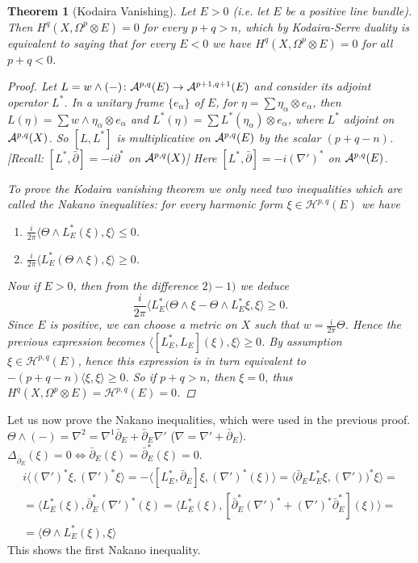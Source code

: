 \documentclass[A4paper, british]{amsart}
\theoremstyle{darkgreentheorem}
\newtheorem{thm}{Theorem}[section]
\theoremstyle{darkbluedefinition}
\theoremstyle{darkredexample}
\theoremstyle{remark}
\renewcommand{\H}{\mathcal{H}}
\newcommand{\1}{\mathbbm{1}}
\newcommand{\ot}{\otimes}
\begin{document}
\begin{thm}[Kodaira Vanishing]
    Let $E>0$ (i.e. let $E$ be a positive line bundle).
    Then $H^{q}(X,\Omega^{p}\ot E)=0$ for every $p+q>n$, which by Kodaira-Serre duality is equivalent to saying that for every $E<0$ we have $H^{q}(X,\Omega^{p}\ot E)=0$ for all $p+q<0$.
    \begin{proof}
	Let $L=w\wedge (-)\colon \mathcal{A}^{p,q}(E)\to \mathcal{A}^{p+1,q+1}(E)$ and consider its adjoint operator $L^{*}$.
	In a unitary frame $\{e_{\alpha}\}$ of $E$, for $\eta=\sum \eta_{\alpha}\ot e_{\alpha}$, then $L(\eta)=\sum w\wedge \eta_{\alpha}\ot e_{\alpha}$ and $L^{*}(\eta)=\sum L^{*}(\eta_{\alpha})\ot e_{\alpha}$, where $L^{*}$ adjoint on $\mathcal{A}^{p,q}(X)$.
	So $[L,L^{*}]$ is multiplicative on $\mathcal{A}^{p,q}(E)$ by the scalar $(p+q-n)$.
	[Recall: $[L^{*},\bar{\partial}]=-i\partial^{*}$ on $\mathcal{A}^{p,q}(X)$]
	Here $[L^{*},\bar{\partial}]=-i(\nabla')^{*}$ on $\mathcal{A}^{p,q}(E)$.

	To prove the Kodaira vanishing theorem we only need two inequalities which are called the \textit{Nakano inequalities}: for every harmonic form $\xi \in \H^{p,q}(E)$ we have
	\begin{enumerate}[label=\arabic*)]
	    \item $\frac{i}{2\pi} \langle \Theta \wedge L_{E}^{*}(\xi), \xi\rangle \leqslant 0$.
	    \item $\frac{i}{2\pi} \langle L_{E}^{*}(\Theta \wedge \xi),\xi\rangle \geqslant 0$.
	\end{enumerate}

	Now if $E>0$, then from the difference $2)-1)$ we deduce
	\[ \frac{i}{2\pi}\langle L_{E}^{*}(\Theta \wedge \xi -\Theta \wedge L_{E}^{*}\xi ,\xi\rangle \geqslant 0 .\]
	Since $E$ is positive, we can choose a metric on $X$ such that $w=\frac{i}{2\pi}\Theta$.
	Hence the previous expression becomes $\langle [L_{E}^{*},L_{E}](\xi),\xi\rangle \geqslant 0$.
	By assumption $\xi\in \H^{p,q}(E)$, hence this expression is in turn equivalent to $-(p+q-n)\langle \xi ,\xi\rangle \geqslant 0 $.
	So if $p+q>n$, then $\xi=0$, thus $H^{q}(X,\Omega^{p}\ot E)=\H^{p,q}(E)=0$.
    \end{proof}
\end{thm}

Let us now prove the Nakano inequalities, which were used in the previous proof.
$\Theta \wedge (-)=\nabla^{2}=\nabla^{1}\bar{\partial}_{E}+\bar{\partial}_{E}\nabla'$ ($\nabla=\nabla'+\bar{\partial}_{E}$).
$\Delta_{\bar{\partial}_{E}}(\xi)=0 \Leftrightarrow \bar{\partial }_{E}(\xi)=\bar{\partial}_{E}^{*}(\xi)=0$.
\begin{multline*}
    i\langle (\nabla')^{*}\xi,(\nabla')^{*}\xi\rangle=-\langle [L_{E}^{*},\bar{\partial}_{E}]\xi,(\nabla')^{*}(\xi)\rangle = \langle \bar{\partial}_{E} L_{E}^{*}\xi,(\nabla'))^{*}\xi\rangle =\\
    =\langle L_{E}^{*}(\xi),\bar{\partial}_{E}^{*}(\nabla')^{*}(\xi)=\langle L_{E}^{*}(\xi),[\bar{\partial}_{E}^{*}(\nabla')^{*}+(\nabla')^{*}\bar{\partial}_{E}^{*}](\xi)\rangle = \\
    =\langle \Theta \wedge L_{E}^{*}(\xi),\xi\rangle 
\end{multline*}
This shows the first Nakano inequality.
\end{document}
